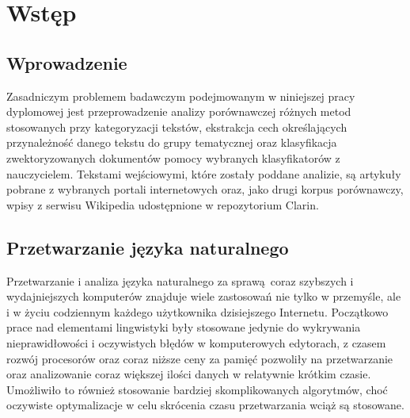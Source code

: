 \chapter{Wstęp}
\section{Wprowadzenie}
Zasadniczym problemem badawczym podejmowanym w niniejszej pracy dyplomowej jest przeprowadzenie analizy porównawczej różnych metod stosowanych przy kategoryzacji tekstów, ekstrakcja cech określających przynależność danego tekstu do grupy tematycznej oraz klasyfikacja zwektoryzowanych dokumentów pomocy wybranych klasyfikatorów z nauczycielem. Tekstami wejściowymi, które zostały poddane analizie, są artykuły pobrane z wybranych portali internetowych oraz, jako drugi korpus porównawczy, wpisy z serwisu Wikipedia udostępnione w repozytorium Clarin.

\section{Przetwarzanie języka naturalnego}
Przetwarzanie i analiza języka naturalnego za sprawą coraz szybszych i wydajniejszych komputerów znajduje wiele zastosowań nie tylko w przemyśle, ale i w życiu codziennym każdego użytkownika dzisiejszego Internetu. Początkowo prace nad elementami lingwistyki były stosowane jedynie do wykrywania nieprawidłowości i oczywistych błędów w komputerowych edytorach, z czasem rozwój procesorów oraz coraz niższe ceny za pamięć pozwoliły na przetwarzanie oraz analizowanie coraz większej ilości danych w relatywnie krótkim czasie. Umożliwiło to również stosowanie bardziej skomplikowanych algorytmów, choć oczywiste optymalizacje w celu skrócenia czasu przetwarzania wciąż są stosowane. \cite{indeksowanietresci}


